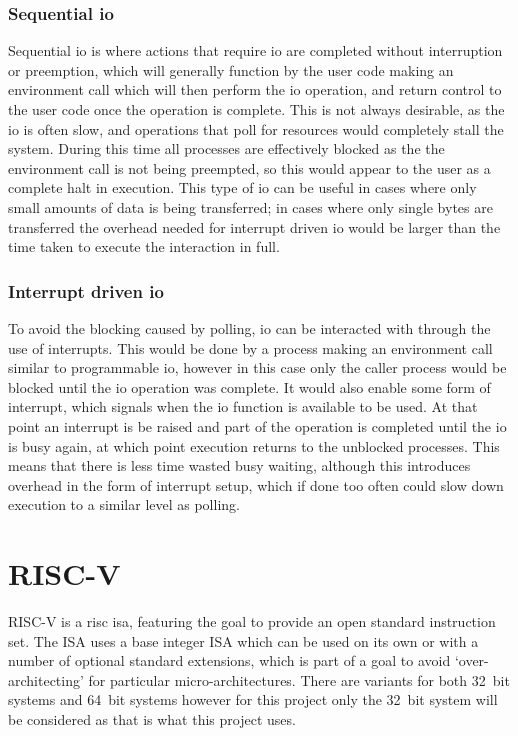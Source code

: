 \subsubsection{Sequential \ac{io}}
Sequential \ac{io} is where actions that require \ac{io} are completed without interruption or preemption, which will generally function by the user code making an environment call which will then perform the \ac{io} operation, and return control to the user code once the operation is complete. This is not always desirable, as the \ac{io} is often slow, and operations that poll for resources would completely stall the system. During this time all processes are effectively blocked as the the environment call is not being preempted, so this would appear to the user as a complete halt in execution. This type of \ac{io} can be useful in cases where only small amounts of data is being transferred; in cases where only single bytes are transferred the overhead needed for interrupt driven \ac{io} would be larger than the time taken to execute the interaction in full.
\subsubsection{Interrupt driven \ac{io}}
To avoid the blocking caused by polling, \ac{io} can be interacted with through the use of interrupts. This would be done by a process making an environment call similar to programmable \ac{io}, however in this case only the caller process would be blocked until the \ac{io} operation was complete. It would also enable some form of interrupt, which signals when the \ac{io} function is available to be used. At that point an interrupt is be raised and part of the operation is completed until the \ac{io} is busy again, at which point execution returns to the unblocked processes. This means that there is less time wasted busy waiting, although this introduces overhead in the form of interrupt setup, which if done too often could slow down execution to a similar level as polling.
\section{RISC-V}
RISC-V is a \ac{risc} \ac{isa}, featuring the goal to provide an open standard instruction set\cite{riscv_aims}. The ISA uses a base integer ISA which can be used on its own or with a number of optional standard extensions, which is part of a goal to avoid `over-architecting' for particular micro-architectures. There are variants for both 32~bit systems and 64~bit systems however for this project only the 32~bit system will be considered as that is what this project uses\cite{riscv_unpriv}.
